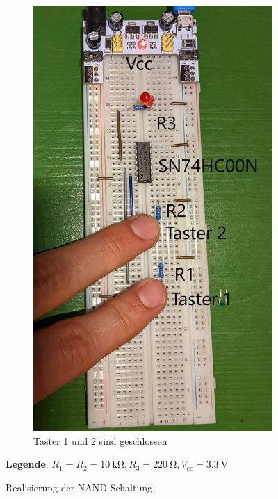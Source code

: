 \documentclass[
    paper=a4,
]{scrartcl}
\newcommand{\legend}[1]{\par\footnotesize\textbf{Legende}: #1\par}
\begin{document}
\begin{figure}
\begin{subfigure}[t]{0.3\textwidth}
            \includegraphics[width=0.9\linewidth]{Anhang/Bild2.3.jpg}
            \caption{Taster 1 und 2 sind geschlossen}
        \end{subfigure}
        \caption{Realisierung der NAND-Schaltung}
        \legend{\(R_1=R_2=\SI{10}{\kilo\ohm}, R_3=\SI{220}{\ohm}, V_{cc}=\SI{3.3}{\volt}\)}
        \label{fig:2}
    \end{figure}
\end{document}
